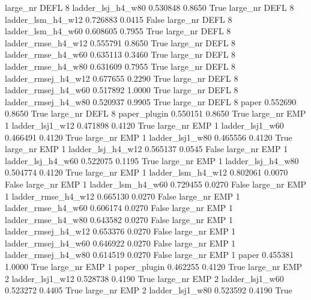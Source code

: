   large_nr     DEFL                 8   ladder_lsj_h4_w80   0.530848      0.8650    True
  large_nr     DEFL                 8   ladder_lsm_h4_w12   0.726883      0.0415   False
  large_nr     DEFL                 8   ladder_lsm_h4_w60   0.608605      0.7955    True
  large_nr     DEFL                 8  ladder_rmse_h4_w12   0.555791      0.8650    True
  large_nr     DEFL                 8  ladder_rmse_h4_w60   0.635113      0.3460    True
  large_nr     DEFL                 8  ladder_rmse_h4_w80   0.631609      0.7955    True
  large_nr     DEFL                 8 ladder_rmsej_h4_w12   0.677655      0.2290    True
  large_nr     DEFL                 8 ladder_rmsej_h4_w60   0.517892      1.0000    True
  large_nr     DEFL                 8 ladder_rmsej_h4_w80   0.520937      0.9905    True
  large_nr     DEFL                 8               paper   0.552690      0.8650    True
  large_nr     DEFL                 8        paper_plugin   0.550151      0.8650    True
  large_nr      EMP                 1     ladder_lsj1_w12   0.471898      0.4120    True
  large_nr      EMP                 1     ladder_lsj1_w60   0.466491      0.4120    True
  large_nr      EMP                 1     ladder_lsj1_w80   0.465556      0.4120    True
  large_nr      EMP                 1   ladder_lsj_h4_w12   0.565137      0.0545   False
  large_nr      EMP                 1   ladder_lsj_h4_w60   0.522075      0.1195    True
  large_nr      EMP                 1   ladder_lsj_h4_w80   0.504774      0.4120    True
  large_nr      EMP                 1   ladder_lsm_h4_w12   0.802061      0.0070   False
  large_nr      EMP                 1   ladder_lsm_h4_w60   0.729455      0.0270   False
  large_nr      EMP                 1  ladder_rmse_h4_w12   0.665130      0.0270   False
  large_nr      EMP                 1  ladder_rmse_h4_w60   0.606174      0.0270   False
  large_nr      EMP                 1  ladder_rmse_h4_w80   0.643582      0.0270   False
  large_nr      EMP                 1 ladder_rmsej_h4_w12   0.653376      0.0270   False
  large_nr      EMP                 1 ladder_rmsej_h4_w60   0.646922      0.0270   False
  large_nr      EMP                 1 ladder_rmsej_h4_w80   0.614519      0.0270   False
  large_nr      EMP                 1               paper   0.455381      1.0000    True
  large_nr      EMP                 1        paper_plugin   0.462255      0.4120    True
  large_nr      EMP                 2     ladder_lsj1_w12   0.528738      0.4190    True
  large_nr      EMP                 2     ladder_lsj1_w60   0.523272      0.4405    True
  large_nr      EMP                 2     ladder_lsj1_w80   0.523592      0.4190    True
